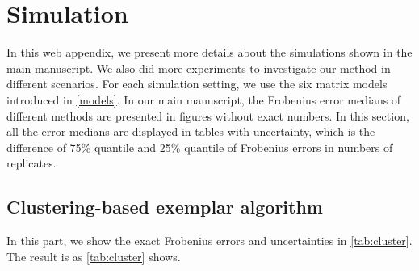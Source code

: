\documentclass[useAMS,referee,usenatbib]{biom}
\begin{document}
\pagebreak
\appendix
\section*{Simulation} 
In this web appendix, we present more details about the simulations shown in the main manuscript. We also did more experiments to investigate our method in different scenarios. For each simulation setting, we use the six matrix models introduced in \ref{models}. In our main manuscript, the Frobenius error medians of different methods are presented in figures without exact numbers. In this section, all the error medians are displayed in tables with uncertainty, which is the difference of 75\% quantile and 25\% quantile of Frobenius errors in numbers of replicates.

\subsection{Clustering-based exemplar algorithm}
In this part, we show the exact Frobenius errors and uncertainties in \ref{tab:cluster}. The result is as \ref{tab:cluster} shows.
\end{document}
